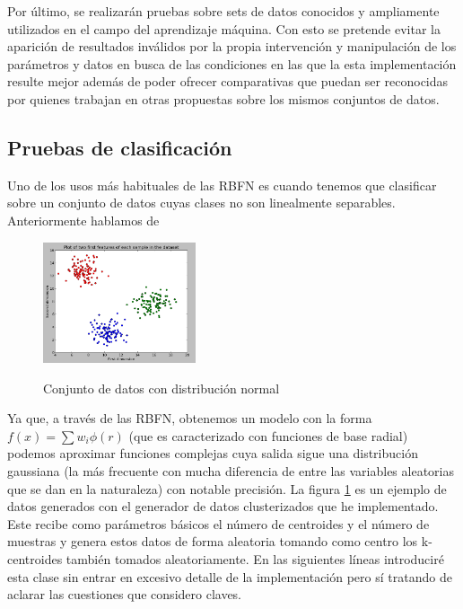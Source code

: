 \documentclass[10pt,a4paper]{report}
\begin{document}
Por último, se realizarán pruebas sobre sets de datos conocidos y ampliamente utilizados en el campo del aprendizaje máquina. Con esto se pretende evitar la aparición de resultados inválidos por la propia intervención y manipulación de los parámetros y datos en busca de las condiciones en las que la esta implementación resulte mejor además de poder ofrecer comparativas que puedan ser reconocidas por quienes trabajan en otras propuestas sobre los mismos conjuntos de datos.

\subsection{Pruebas de clasificación}
Uno de los usos más habituales de las RBFN es cuando tenemos que clasificar sobre un conjunto de datos cuyas clases no son linealmente separables. Anteriormente hablamos de
\begin{figure}[!h]{}
    \centering
    \includegraphics[width=0.4\textwidth]{img/clusteredData1.png}
    \label{fig:clusteredData1}
    \caption{Conjunto de datos con distribución normal}
\end{figure}
Ya que, a través de las RBFN, obtenemos un modelo con la forma $f(x)=\sum w_{i}\phi(r)$ (que es caracterizado con funciones de base radial) podemos aproximar funciones complejas cuya salida sigue una distribución gaussiana (la más frecuente con mucha diferencia de entre las variables aleatorias que se dan en la naturaleza) con notable precisión. 
La figura \ref{fig:clusteredData1} es un ejemplo de datos generados con el generador de datos clusterizados que he implementado. Este recibe como parámetros básicos el número de centroides y el número de muestras y genera estos datos de forma aleatoria tomando como centro los k-centroides también tomados aleatoriamente. En las siguientes líneas introduciré esta clase sin entrar en excesivo detalle de la implementación pero sí tratando de aclarar las cuestiones que considero claves.
\end{document}
